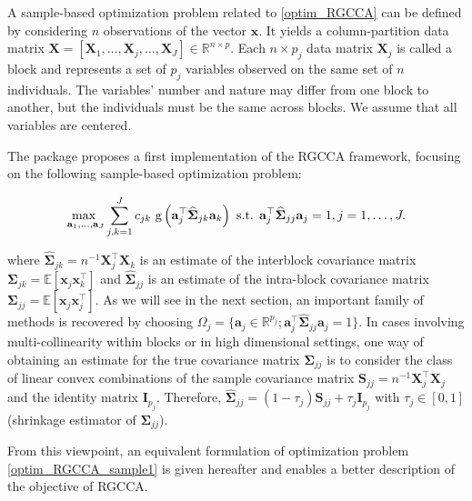 \documentclass[
]{jss}
\begin{document}
A sample-based optimization problem related to \eqref{optim_RGCCA} can
be defined by considering \(n\) observations of the vector
\(\boldsymbol x\). It yields a column-partition data matrix
\(\mathbf X = [\mathbf X_1, \ldots, \mathbf X_j, \ldots, \mathbf X_J] \in \mathbb{R}^{n \times p}\).
Each \(n\times p_j\) data matrix \(\mathbf X_j\) is called a block and
represents a set of \(p_j\) variables observed on the same set of \(n\)
individuals. The variables' number and nature may differ from one block
to another, but the individuals must be the same across blocks. We
assume that all variables are centered.

The  package proposes a first implementation of the RGCCA
framework, focusing on the following sample-based optimization problem:

\begin{equation}
\underset{\mathbf{a}_1, \ldots,\mathbf{a}_J}{\text{max }}  \displaystyle  \sum_{j, k = 1}^J c_{jk} \text{
g}\left(\mathbf{a}_j^\top  \widehat{\mathbf{\Sigma}}_{jk} \mathbf{a}_k\right)\\
\text{ s.t. } \mathbf a_j^\top \widehat{\mathbf{\Sigma}}_{jj}\mathbf{a}_j = 1, j =1, \ldots, J.
\label{optim_RGCCA_sample1}
\end{equation}

where
\(\widehat{\mathbf{\Sigma}}_{jk}= n^{-1} \mathbf X_j^\top  \mathbf X_k\)
is an estimate of the interblock covariance matrix
\(\mathbf{\Sigma}_{jk}= \mathbb{E}[\boldsymbol x_j\boldsymbol x_k^\top]\)
and \(\widehat{\boldsymbol \Sigma}_{jj}\) is an estimate of the
intra-block covariance matrix
\(\mathbf{\Sigma}_{jj} = \mathbb{E}[\boldsymbol x_j\boldsymbol x_j^\top]\).
As we will see in the next section, an important family of methods is
recovered by choosing
\(\Omega_j = \{\mathbf a_j \in \mathbb{R}^{p_j}; \mathbf a_j^\top \widehat{\boldsymbol \Sigma}_{jj} \mathbf a_j = 1\}\).
In cases involving multi-collinearity within blocks or in high
dimensional settings, one way of obtaining an estimate for the true
covariance matrix \(\mathbf{\Sigma}_{jj}\) is to consider the class of
linear convex combinations of the sample covariance matrix
\(\mathbf{S}_{jj} = n^{-1} \mathbf X_j^\top  \mathbf X_j\) and the
identity matrix \(\mathbf I_{p_j}\). Therefore,
\(\widehat{\mathbf{\Sigma}}_{jj} = (1-\tau_j)\mathbf{S}_{jj} + \tau_j\mathbf{I}_{p_j}\)
with \(\tau_j \in [0,1]\) (shrinkage estimator of
\(\mathbf{\Sigma}_{jj}\)).

From this viewpoint, an equivalent formulation of optimization problem
\eqref{optim_RGCCA_sample1} is given hereafter and enables a better
description of the objective of RGCCA.
\end{document}
